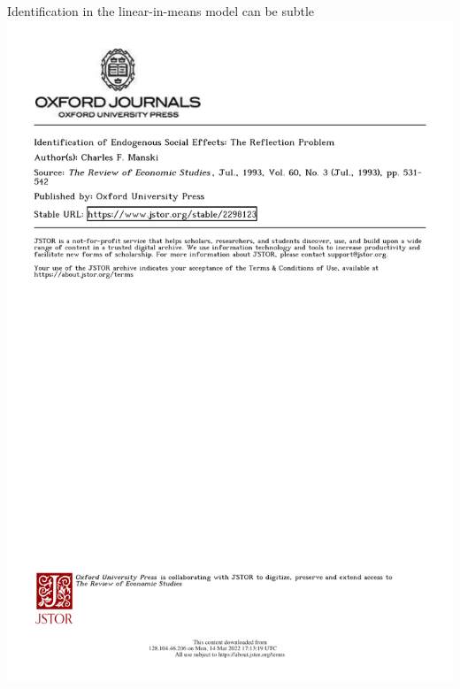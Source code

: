 \documentclass[aspectratio=169]{beamer}
\theoremstyle{remark}
\begin{document}
\begin{frame}{Identification in the linear-in-means model can be subtle}
    \centering
    \includegraphics[height=0.95\textheight, page=2, trim={0 14cm 0 0}, clip]{./papers/manski.pdf}
\end{frame}
\end{document}
